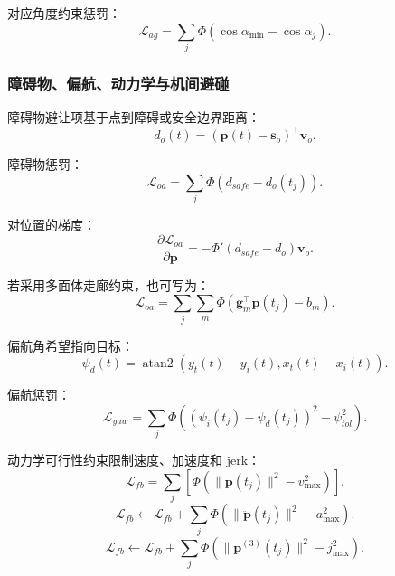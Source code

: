 ﻿\documentclass[UTF8,a4paper,11pt]{ctexart}
\begin{document}
对应角度约束惩罚：
\begin{equation}
\mathcal L_{ag}=\sum_j \Phi(\cos\alpha_{\min}-\cos\alpha_j).
\tag{28}
\end{equation}

\subsubsection{障碍物、偏航、动力学与机间避碰}

障碍物避让项基于点到障碍或安全边界距离：
\begin{equation}
d_o(t)=\left(\bm p(t)-\bm s_o\right)^\top\bm v_o .
\tag{29}
\end{equation}

障碍物惩罚：
\begin{equation}
\mathcal L_{oa}=\sum_j\Phi(d_{safe}-d_o(t_j)).
\tag{30}
\end{equation}

对位置的梯度：
\begin{equation}
\frac{\partial \mathcal L_{oa}}{\partial \bm p}
=-\Phi'(d_{safe}-d_o)\bm v_o .
\tag{31}
\end{equation}

若采用多面体走廊约束，也可写为：
\begin{equation}
\mathcal L_{oa}=\sum_j\sum_m\Phi(\bm g_m^\top\bm p(t_j)-b_m).
\tag{32}
\end{equation}

偏航角希望指向目标：
\begin{equation}
\psi_d(t)=\operatorname{atan2}(y_t(t)-y_i(t),x_t(t)-x_i(t)).
\tag{33}
\end{equation}

偏航惩罚：
\begin{equation}
\mathcal L_{yaw}=\sum_j\Phi((\psi_i(t_j)-\psi_d(t_j))^2-\psi_{tol}^2).
\tag{34}
\end{equation}

动力学可行性约束限制速度、加速度和 jerk：
\begin{equation}
\mathcal L_{fb}=
\sum_j
\left[
\Phi(\|\dot{\bm p}(t_j)\|^2-v_{\max}^2)
\right].
\tag{35}
\end{equation}
\begin{equation}
\mathcal L_{fb}\leftarrow
\mathcal L_{fb}+
\sum_j\Phi(\|\ddot{\bm p}(t_j)\|^2-a_{\max}^2).
\tag{36}
\end{equation}
\begin{equation}
\mathcal L_{fb}\leftarrow
\mathcal L_{fb}+
\sum_j\Phi(\|\bm p^{(3)}(t_j)\|^2-j_{\max}^2).
\tag{37}
\end{equation}
\end{document}
